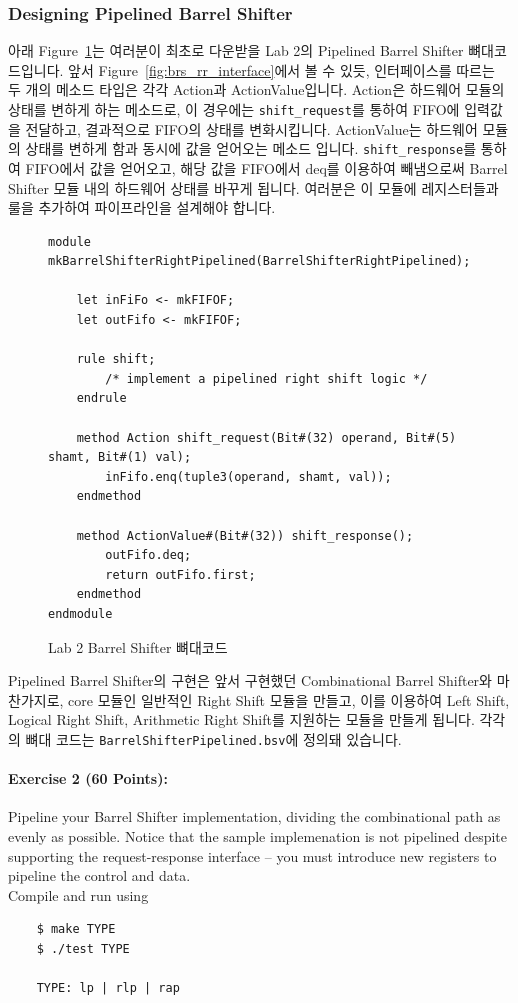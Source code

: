 \documentclass{article}
\begin{document}
\subsubsection{Designing Pipelined Barrel Shifter}
아래 Figure~\ref{fig:brs_skeleton}는 여러분이 최초로 다운받을 Lab 2의 Pipelined Barrel Shifter 뼈대코드입니다. 
앞서 Figure~\ref{fig:brs_rr_interface}에서 볼 수 있듯, 인터페이스를 따르는 두 개의 메소드 타입은 각각 Action과 ActionValue입니다. 
Action은 하드웨어 모듈의 상태를 변하게 하는 메소드로, 이 경우에는 \texttt{shift\_request}를 통하여 FIFO에 입력값을 전달하고, 
결과적으로 FIFO의 상태를 변화시킵니다. ActionValue는 하드웨어 모듈의 상태를 변하게
함과 동시에 값을 얻어오는 메소드 입니다. \texttt{shift\_response}를 통하여 FIFO에서 값을 얻어오고,
해당 값을 FIFO에서 deq를 이용하여 빼냄으로써 Barrel Shifter 모듈 내의 하드웨어 상태를 바꾸게 됩니다. 
여러분은 이 모듈에 레지스터들과 룰을 추가하여 파이프라인을 설계해야 합니다.

\begin{figure}[!ht]
	\centering
\begin{Verbatim}
module mkBarrelShifterRightPipelined(BarrelShifterRightPipelined);

	let inFiFo <- mkFIFOF;
	let outFifo <- mkFIFOF;
	
	rule shift;
	    /* implement a pipelined right shift logic */
	endrule
	
	method Action shift_request(Bit#(32) operand, Bit#(5) shamt, Bit#(1) val);
		inFifo.enq(tuple3(operand, shamt, val));
	endmethod

	method ActionValue#(Bit#(32)) shift_response();
		outFifo.deq;
		return outFifo.first;
	endmethod
endmodule
\end{Verbatim}
	\caption{Lab 2 Barrel Shifter 뼈대코드}
	\label{fig:brs_skeleton}
\end{figure}

Pipelined Barrel Shifter의 구현은 앞서 구현했던 Combinational Barrel Shifter와 마찬가지로,
core 모듈인 일반적인 Right Shift 모듈을 만들고,
이를 이용하여 Left Shift, Logical Right Shift, Arithmetic Right Shift를 지원하는 모듈을 만들게 됩니다.
각각의 뼈대 코드는 \texttt{BarrelShifterPipelined.bsv}에 정의돼 있습니다.


\paragraph{\bf Exercise 2 (60 Points):} Pipeline your Barrel Shifter implementation, 
dividing the combinational path as evenly as possible. Notice that the sample implemenation
is not pipelined despite supporting the request-response interface
– you must introduce new registers to pipeline the control and data. 
\\\indent Compile and run using

\begin{Verbatim}
	$ make TYPE
	$ ./test TYPE

	TYPE: lp | rlp | rap
\end{Verbatim}
\end{document}
